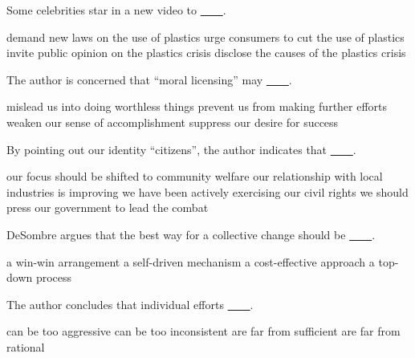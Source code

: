 \item Some celebrities star in a new video to \uline{~~~~}.
\begin{tasks}
	\task demand new laws on the use of plastics
	\task urge consumers to cut the use of plastics
	\task invite public opinion on the plastics crisis
	\task disclose the causes of the plastics crisis
\end{tasks}
\item The author is concerned that ``moral licensing'' may \uline{~~~~}.
\begin{tasks}
	\task mislead us into doing worthless things
	\task prevent us from making further efforts
	\task weaken our sense of accomplishment
	\task suppress our desire for success
\end{tasks}
\item By pointing out our identity ``citizens'', the author indicates that \uline{~~~~}.
\begin{tasks}
	\task our focus should be shifted to community welfare
	\task our relationship with local industries is improving
	\task we have been actively exercising our civil rights
	\task we should press our government to lead the combat
\end{tasks}
\item DeSombre argues that the best way for a collective change should be \uline{~~~~}.
\begin{tasks}
	\task a win-win arrangement
	\task a self-driven mechanism
	\task a cost-effective approach
	\task a top-down process
\end{tasks}
\item The author concludes that individual efforts \uline{~~~~}.
\begin{tasks}
	\task can be too aggressive
	\task can be too inconsistent
	\task are far from sufficient
	\task are far from rational
\end{tasks}